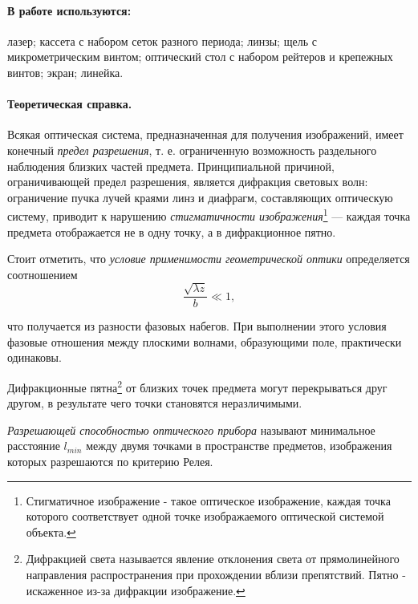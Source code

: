 \documentclass[12pt]{article}
\begin{document}
			\paragraph{В работе используются:}
			лазер; кассета с набором сеток разного периода; линзы; щель с микрометрическим винтом; оптический стол с набором рейтеров и крепежных винтов; экран; линейка.
			
			
			\vspace{2\parskip}
		\paragraph{Теоретическая справка.}
		
		Всякая оптическая система, предназначенная для получения изображений, имеет конечный \textit{предел разрешения}, т. е. ограниченную возможность раздельного наблюдения близких частей предмета.
		Принципиальной причиной, ограничивающей предел разрешения, является дифракция световых волн: ограничение пучка лучей краями линз и диафрагм, составляющих оптическую систему, приводит к нарушению \textit{стигматичности изображения}\footnote{Стигматичное изображение - такое оптическое изображение, каждая точка которого соответствует одной точке изображаемого оптической системой объекта.} — каждая точка предмета отображается не в одну точку, а в дифракционное пятно.
		
		Стоит отметить, что \textit{условие применимости геометрической оптики} определяется соотношением
		\begin{equation}\label{geom_opt}
		\dfrac{\sqrt{\lambda z}}{b} \ll 1,
		\end{equation}
		
		что получается из разности фазовых набегов. При выполнении этого условия фазовые отношения между плоскими волнами, образующими поле, практически одинаковы.
		
		
		Дифракционные пятна\footnote{Дифракцией света называется явление отклонения света от прямолинейного направления распространения при прохождении вблизи препятствий. Пятно - искаженное из-за дифракции изображение.} от близких точек предмета могут перекрываться друг другом, в результате чего точки становятся неразличимыми.
		
		\textit{Разрешающей способностью оптического прибора} называют минимальное расстояние $l_{min}$ между двумя точками в пространстве предметов, изображения которых разрешаются по критерию Релея.
		
\end{document}
